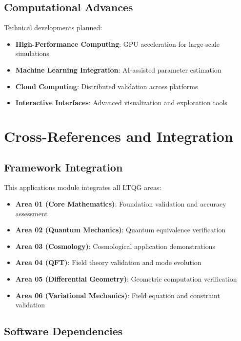 \documentclass[11pt,a4paper]{article}
\theoremstyle{definition}
\theoremstyle{remark}
\begin{document}
\subsection{Computational Advances}

Technical developments planned:

\begin{itemize}
\item \textbf{High-Performance Computing}: GPU acceleration for large-scale simulations
\item \textbf{Machine Learning Integration}: AI-assisted parameter estimation
\item \textbf{Cloud Computing}: Distributed validation across platforms
\item \textbf{Interactive Interfaces}: Advanced visualization and exploration tools
\end{itemize}

\section{Cross-References and Integration}

\subsection{Framework Integration}

This applications module integrates all LTQG areas:
\begin{itemize}
\item \textbf{Area 01 (Core Mathematics)}: Foundation validation and accuracy assessment
\item \textbf{Area 02 (Quantum Mechanics)}: Quantum equivalence verification
\item \textbf{Area 03 (Cosmology)}: Cosmological application demonstrations
\item \textbf{Area 04 (QFT)}: Field theory validation and mode evolution
\item \textbf{Area 05 (Differential Geometry)}: Geometric computation verification
\item \textbf{Area 06 (Variational Mechanics)}: Field equation and constraint validation
\end{itemize}

\subsection{Software Dependencies}
\end{document}
